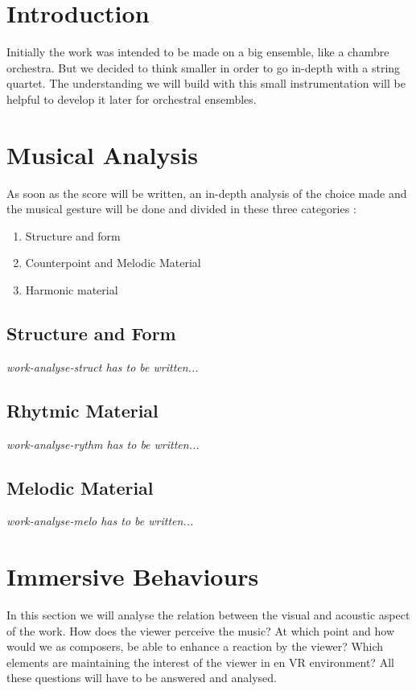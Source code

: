 \documentclass[letterpaper, openright]{report}
\begin{document}
	\section{Introduction} %
	\label{sub:work-intro}
Initially the work was intended to be made on a big ensemble, like a chambre orchestra. But we decided to think smaller in order to go in-depth with a string quartet. The understanding we will build with this small instrumentation will be helpful to develop it later for orchestral ensembles.

    \section{Musical Analysis} %
	\label{sub:work-analyse}
As soon as the score will be written, an in-depth analysis of the choice made and the musical gesture will be done and divided in these three categories : 
\begin{enumerate}
\item Structure and form
\item Counterpoint and Melodic Material
\item Harmonic material
\end{enumerate}

            \subsection{Structure and Form} %
			\label{subsub:work-analyse-struct}
\textit{work-analyse-struct has to be written...}

            \subsection{Rhytmic Material} %
			\label{subsub:work-analyse-rythm}
\textit{work-analyse-rythm has to be written...}

            \subsection{Melodic Material} %
			\label{subsub:work-analyse-melo}
\textit{work-analyse-melo has to be written...}

    
    \section{Immersive Behaviours} %
	\label{sub:work-immersive}
In this section we will analyse the relation between the visual and acoustic aspect of the work. How does the viewer perceive the music? At which point and how would we as composers, be able to enhance a reaction by the viewer? Which elements are maintaining the interest of the  viewer in en \ac{VR} environment? All these questions will have to be answered and analysed.
    
\end{document}
